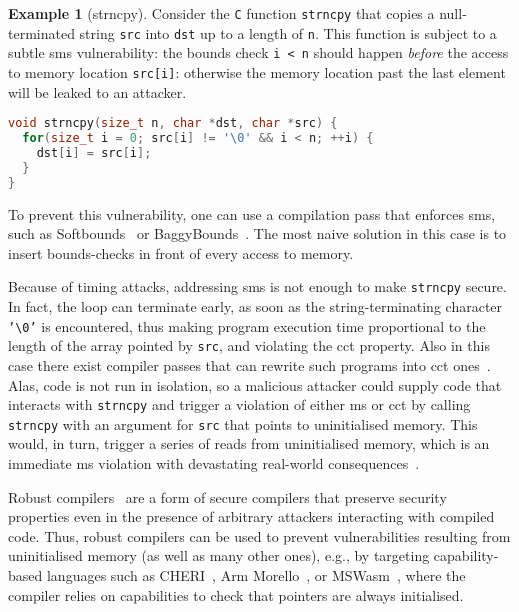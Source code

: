\documentclass[dvipsnames,conference]{IEEEtran}
\theoremstyle{definition}
\newtheorem{exampleenv}{Example}[section]
\begin{document}
\begin{exampleenv}[strncpy]\label{ex:strncpy}
Consider the \texttt{C} function \texttt{strncpy} that copies a null-terminated string \texttt{src} into \texttt{dst} up to a length of \texttt{n}.
This function is subject to a subtle \gls*{sms} vulnerability: the bounds check \texttt{i < n} should happen {\it before} the access to memory location \texttt{src[i]}: otherwise
the memory location past the last element will be leaked to an attacker.
\begin{lstlisting}[language=c,basicstyle=\footnotesize\ttfamily,morekeywords={size_t}]
void strncpy(size_t n, char *dst, char *src) {
  for(size_t i = 0; src[i] != '\0' && i < n; ++i) {
    dst[i] = src[i];
  }
}
\end{lstlisting}

To prevent this vulnerability, one can use a compilation pass that enforces \gls*{sms}, such as Softbounds~\cite{nagarakatte2009soft} or BaggyBounds~\cite{akritidis2009baggy}.
The most naive solution in this case is to insert bounds-checks in front of every access to memory.

Because of timing attacks, addressing \gls*{sms} is not enough to make \texttt{strncpy} secure.
In fact, the loop can terminate early, as soon as the string-terminating character \texttt{'\textbackslash 0'} is encountered, thus making program execution time proportional to the length of the array pointed by \texttt{src}, and violating the \gls*{cct} property.
Also in this case there exist compiler passes that can rewrite such programs into \gls*{cct} ones~\cite{cauligi2019fact}.
%
Alas, code is not run in isolation, so a malicious attacker could supply code that interacts with \texttt{strncpy} and trigger a violation of either \gls*{ms} or \gls*{cct} by calling \texttt{strncpy} with an argument for \texttt{src} that points to uninitialised memory.
This would, in turn, trigger a series of reads from uninitialised memory, which is an immediate \gls*{ms} violation with devastating real-world consequences~\cite{uninit-0,uninit-1,uninit-2,uninit-3,uninit-4}.

Robust compilers~\cite{abate2019jour} are a form of secure compilers that preserve security properties even in the presence of arbitrary attackers interacting with compiled code.
Thus, robust compilers can be used to prevent vulnerabilities resulting from uninitialised memory (as well as many other ones), e.g., by targeting capability-based languages such as CHERI~\cite{woodruff2014CHERI}, Arm Morello~\cite{arm-morello}, or MSWasm~\cite{michael2023mswasm}, where the compiler relies on capabilities to check that pointers are always initialised.
\end{exampleenv}
\end{document}
